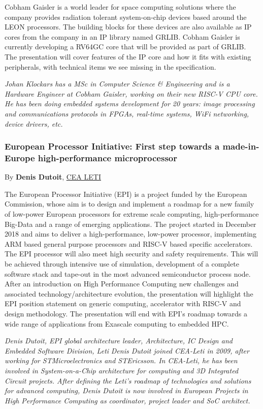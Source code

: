 \documentclass[a4paper, 10pt]{article}
\begin{document}
{Cobham Gaisler is a world leader for space computing solutions where
the company provides radiation tolerant system-on-chip devices based
around the LEON processors. The building blocks for these devices are
also available as IP cores from the company in an IP library named
GRLIB.  Cobham Gaisler is currently developing a RV64GC core that will
be provided as part of GRLIB. The presentation will cover features of
the IP core and how it fits with existing peripherals, with technical
items we see missing in the specification.

\emph{\footnotesize Johan Klockars has a MSc in Computer Science \& Engineering and is a Hardware Engineer at Cobham Gaisler, working on their new RISC-V CPU core. He has been doing embedded systems development for 20 years: image processing and communications protocols in FPGAs, real-time systems, WiFi networking, device drivers, etc.}

\subsubsection{European Processor Initiative: First step towards a made-in-Europe high-performance microprocessor}
\label{sec:org6bcc10e}
By \textbf{Denis Dutoit}, \href{https://www.leti-cea.com}{CEA LETI}

The European Processor Initiative (EPI) is a project funded by the European Commission, whose aim is to design and implement a roadmap for a new family of low-power European processors for extreme scale computing, high-performance
Big-Data and a range of emerging applications. The project started in December 2018 and aims to deliver a high-performance, low-power processor, implementing ARM based general purpose processors and RISC-V based specific accelerators.
The EPI processor will also meet high security and safety requirements. This will be achieved through intensive use of simulation, development of a complete software stack and tape-out in the most advanced semiconductor process node.
After an introduction on High Performance Computing new challenges and associated technology/architecture evolution, the presentation will highlight the EPI position statement on generic computing, accelerator with RISC-V and design
methodology. The presentation will end with EPI’s roadmap towards a wide range of applications from Exascale computing to embedded HPC.

\emph{\footnotesize Denis Dutoit, EPI global architecture leader, Architecture, IC Design and Embedded Software Division, Leti}
\emph{\footnotesize Denis Dutoit joined CEA-Leti in 2009, after working for STMicroelectronics and STEricsson. In CEA-Leti, he has been involved in System-on-a-Chip architecture for computing and 3D Integrated Circuit projects. After defining the Leti’s roadmap of technologies and solutions for advanced computing, Denis Dutoit is now involved in European Projects in High Performance Computing as coordinator, project leader and SoC architect.}

}
\end{document}
